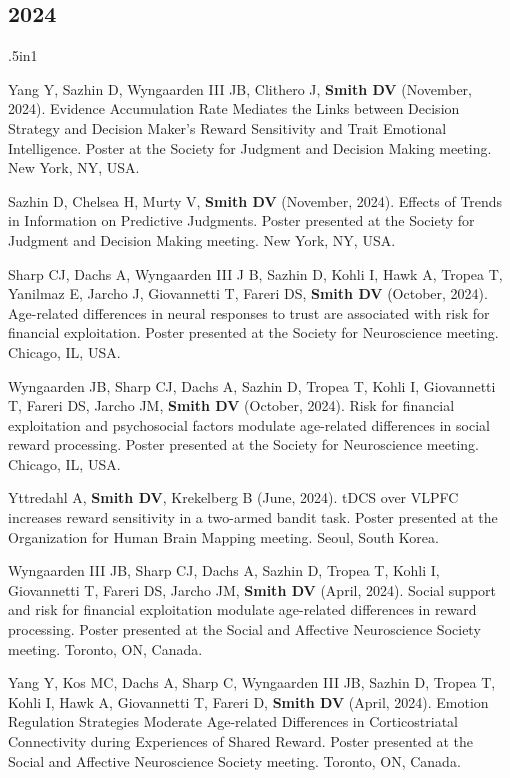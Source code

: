\documentclass[11pt, letterpaper]{article}
\begin{document}
\subsection*{2024}
\begin{hangparas}{.5in}{1}

Yang Y, Sazhin D, Wyngaarden III JB, Clithero J, \textbf{Smith DV} (November, 2024). Evidence Accumulation Rate Mediates the Links between Decision Strategy and Decision Maker’s Reward Sensitivity and Trait Emotional Intelligence. Poster at the Society for Judgment and Decision Making meeting. New York, NY, USA.

Sazhin D, Chelsea H, Murty V, \textbf{Smith DV} (November, 2024). Effects of Trends in Information on Predictive Judgments. Poster presented at the Society for Judgment and Decision Making meeting. New York, NY, USA.

Sharp CJ, Dachs A, Wyngaarden III J B, Sazhin D, Kohli I, Hawk A, Tropea T, Yanilmaz E, Jarcho J, Giovannetti T, Fareri DS, \textbf{Smith DV} (October, 2024). Age-related differences in neural responses to trust are associated with risk for financial exploitation. Poster presented at the Society for Neuroscience meeting. Chicago, IL, USA.

Wyngaarden JB, Sharp CJ, Dachs A, Sazhin D, Tropea T, Kohli I, Giovannetti T, Fareri DS, Jarcho JM, \textbf{Smith DV} (October, 2024). Risk for financial exploitation and psychosocial factors modulate age-related differences in social reward processing. Poster presented at the Society for Neuroscience meeting. Chicago, IL, USA.

Yttredahl A, \textbf{Smith DV}, Krekelberg B (June, 2024). tDCS over VLPFC increases reward sensitivity in a two-armed bandit task. Poster presented at the Organization for Human Brain Mapping meeting. Seoul, South Korea.

Wyngaarden III JB, Sharp CJ, Dachs A, Sazhin D, Tropea T, Kohli I, Giovannetti T, Fareri DS, Jarcho JM, \textbf{Smith DV} (April, 2024). Social support and risk for financial exploitation modulate age-related differences in reward processing. Poster presented at the Social and Affective Neuroscience Society meeting. Toronto, ON, Canada.

Yang Y, Kos MC, Dachs A, Sharp C, Wyngaarden III JB, Sazhin D, Tropea T, Kohli I, Hawk A, Giovannetti T, Fareri D, \textbf{Smith DV} (April, 2024). Emotion Regulation Strategies Moderate Age-related Differences in Corticostriatal Connectivity during Experiences of Shared Reward. Poster presented at the Social and Affective Neuroscience Society meeting. Toronto, ON, Canada.


\end{hangparas}
\end{document}
